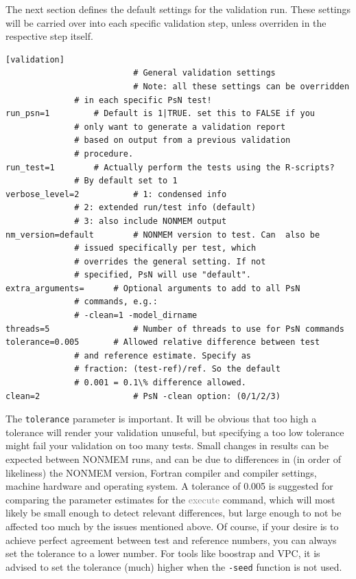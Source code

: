 \documentclass[a4,11pt]{report} \usepackage[pdftex]{graphicx}
\newcommand{\psn}[1]{\textcolor{Grey}{#1}}
\begin{document}
\vspace{5pt}

\noindent The next section defines the default settings for the
validation run. These settings will be carried over into each specific
validation step, unless overriden in the respective step itself.

\begin{lstlisting}
[validation]              
                          # General validation settings
                          # Note: all these settings can be overridden
			  # in each specific PsN test!
run_psn=1		  # Default is 1|TRUE. set this to FALSE if you
			  # only want to generate a validation report
			  # based on output from a previous validation
			  # procedure.
run_test=1		  # Actually perform the tests using the R-scripts?
			  # By default set to 1
verbose_level=2           # 1: condensed info
			  # 2: extended run/test info (default)
			  # 3: also include NONMEM output
nm_version=default        # NONMEM version to test. Can  also be
			  # issued specifically per test, which
			  # overrides the general setting. If not
			  # specified, PsN will use "default".
extra_arguments=	  # Optional arguments to add to all PsN
			  # commands, e.g.:
			  # -clean=1 -model_dirname
threads=5                 # Number of threads to use for PsN commands
tolerance=0.005  	  # Allowed relative difference between test
		 	  # and reference estimate. Specify as
		 	  # fraction: (test-ref)/ref. So the default
		 	  # 0.001 = 0.1\% difference allowed.
clean=2                   # PsN -clean option: (0/1/2/3)
\end{lstlisting}

\vspace{5pt}
\noindent The {\tt tolerance} parameter is important. It will be
obvious that too high a tolerance will render your validation
unuseful, but specifying a too low tolerance might fail your
validation on too many tests. Small changes in results can be expected
between NONMEM runs, and can be due to differences in (in order of
likeliness) the NONMEM version, Fortran compiler and compiler
settings, machine hardware and operating system. A tolerance of 0.005
is suggested for comparing the parameter estimates for the
\psn{execute} command, which will most likely be small enough to
detect relevant differences, but large enough to not be affected too
much by the issues mentioned above. Of course, if your desire is to
achieve perfect agreement between test and reference numbers, you can
always set the tolerance to a lower number. For tools like boostrap
and VPC, it is advised to set the tolerance (much) higher when the
{\tt -seed} function is not used.
\end{document}
